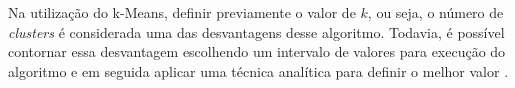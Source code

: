 Na utilização do k-Means, definir previamente o valor de $k$, ou seja, o número de \textit{clusters} é considerada uma das desvantagens desse algoritmo. Todavia,
é possível contornar essa desvantagem escolhendo um intervalo de valores para execução do algoritmo e em seguida aplicar
uma técnica analítica para definir o melhor valor \cite{han2011data}.


% 
% 
% 
% 
% 
% 
% 
% 
% 
% 
